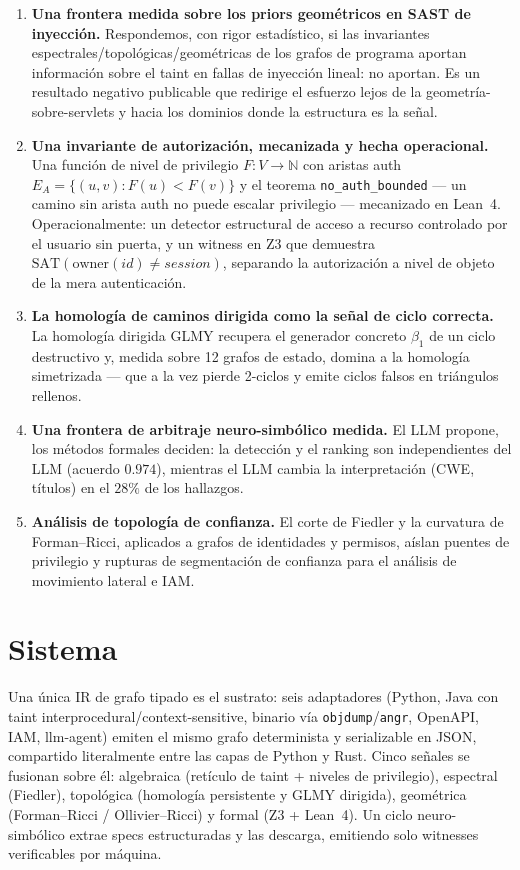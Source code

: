 \documentclass[11pt]{article}
\newcommand{\N}{\mathbb{N}}
\begin{document}
\begin{enumerate}[label=\textbf{C\arabic*.},leftmargin=3em]
\item \textbf{Una frontera medida sobre los priors geométricos en SAST de
inyección.} Respondemos, con rigor estadístico, si las invariantes
espectrales/topológicas/geométricas de los grafos de programa aportan información
sobre el taint en fallas de inyección lineal: no aportan. Es un resultado negativo
publicable que redirige el esfuerzo lejos de la geometría-sobre-servlets y hacia
los dominios donde la estructura es la señal.

\item \textbf{Una invariante de autorización, mecanizada y hecha operacional.} Una
función de nivel de privilegio $F:V\to\N$ con aristas auth
$E_A=\{(u,v):F(u)<F(v)\}$ y el teorema \texttt{no\_auth\_bounded} --- un camino
sin arista auth no puede escalar privilegio --- mecanizado en Lean~4.
Operacionalmente: un detector estructural de acceso a recurso controlado por el
usuario sin puerta, y un witness en Z3 que demuestra
$\mathrm{SAT}(\mathrm{owner}(id)\neq session)$, separando la autorización a nivel
de objeto de la mera autenticación.

\item \textbf{La homología de caminos dirigida como la señal de ciclo correcta.}
La homología dirigida GLMY recupera el generador concreto $\beta_1$ de un ciclo
destructivo y, medida sobre 12 grafos de estado, domina a la homología
simetrizada --- que a la vez pierde 2-ciclos y emite ciclos falsos en triángulos
rellenos.

\item \textbf{Una frontera de arbitraje neuro-simbólico medida.} El LLM propone,
los métodos formales deciden: la detección y el ranking son independientes del LLM
(acuerdo $0.974$), mientras el LLM cambia la interpretación (CWE, títulos) en el
$28\%$ de los hallazgos.

\item \textbf{Análisis de topología de confianza.} El corte de Fiedler y la
curvatura de Forman--Ricci, aplicados a grafos de identidades y permisos, aíslan
puentes de privilegio y rupturas de segmentación de confianza para el análisis de
movimiento lateral e IAM.
\end{enumerate}

\section{Sistema}
Una única IR de grafo tipado es el sustrato: seis adaptadores (Python, Java con
taint interprocedural/context-sensitive, binario vía \texttt{objdump}/\texttt{angr},
OpenAPI, IAM, llm-agent) emiten el mismo grafo determinista y serializable en
JSON, compartido literalmente entre las capas de Python y Rust. Cinco señales se
fusionan sobre él: algebraica (retículo de taint + niveles de privilegio),
espectral (Fiedler), topológica (homología persistente y GLMY dirigida),
geométrica (Forman--Ricci / Ollivier--Ricci) y formal (Z3 + Lean~4). Un ciclo
neuro-simbólico extrae specs estructuradas y las descarga, emitiendo solo
witnesses verificables por máquina.
\end{document}
